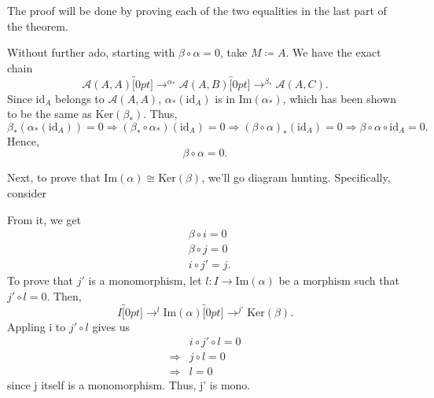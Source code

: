 \documentclass[../category_theory.tex]{subfiles}
\begin{document}
\begin{proof*}
	The proof will be done by proving each of the two equalities in the last part of the theorem.

	Without further ado, starting with \(\beta \circ \alpha =0\), take \(M\coloneqq A\). We have the exact chain
	\[
		\mathcal{A}(A, A)\overbracket[0pt]{\rightarrow}^{\alpha_{*}}\mathcal{A}(A, B)\overbracket[0pt]{\rightarrow}^{\beta_{*}}\mathcal{A}(A, C).
	\]
	Since \(\mathrm{id}_{A}\) belongs to \(\mathcal{A}(A, A)\), \(\alpha_{*}(\mathrm{id}_{A})\) is in \(\mathrm{Im}(\alpha_{*})\), which has been shown to be the same as \(\mathrm{Ker}(\beta_{*})\). Thus,
	\[
		\beta_{*}(\alpha_{*}(\mathrm{id}_{A}))=0\Rightarrow (\beta_{*}\circ \alpha_{*})(\mathrm{id}_{A})=0\Rightarrow (\beta \circ \alpha )_{*}(\mathrm{id}_{A}) = 0\Rightarrow \beta \circ \alpha \circ \mathrm{id}_{A}=0.
	\]
	Hence,
	\[
		\beta \circ \alpha =0.
	\]

	Next, to prove that \(\mathrm{Im}(\alpha )\cong \mathrm{Ker}(\beta )\), we'll go diagram hunting. Specifically, consider
	\begin{center}
	\end{center}
	From it, we get
	\begin{align*}
		 & \beta \circ i=0 \\
		 & \beta \circ j=0 \\
		 & i\circ j'=j.
	\end{align*}
	To prove that \(j'\) is a monomorphism, let \(l:I\rightarrow \mathrm{Im}(\alpha )\) be a morphism such that \(j'\circ l = 0\). Then,
	\[
		I\overbracket[0pt]{\rightarrow}^{l}\mathrm{Im}(\alpha )\overbracket[0pt]{\rightarrow}^{j'}\mathrm{Ker}(\beta ).
	\]
	Appling i to \(j'\circ l\) gives us
	\begin{align*}
		            & i\circ j'\circ l=0 \\
		\Rightarrow & j\circ l = 0       \\
		\Rightarrow & l = 0
	\end{align*}
	since j itself is a monomorphism. Thus, j' is mono.


\end{proof*}
\end{document}
